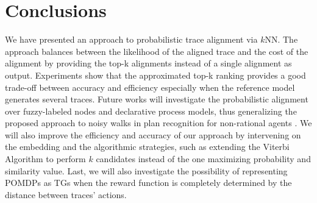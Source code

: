 
\section{Conclusions}
\label{sec:conclusion}

We have presented an approach to probabilistic trace alignment via $k$NN.
The approach balances between the likelihood of the aligned trace and the cost of the alignment by providing the top-k 
alignments instead of a single alignment as output. Experiments show that the approximated top-k ranking provides a good 
trade-off between accuracy and efficiency especially when the reference model generates several traces.
Future works will investigate the probabilistic alignment over fuzzy-labeled nodes and declarative process models, thus 
generalizing the proposed approach to noisy walks in plan recognition for non-rational agents \cite{RamirezG10}. We will also improve 
the efficiency and accuracy of our approach by intervening on the embedding and the algorithmic strategies, such as extending 
the Viterbi Algorithm  to perform $k$ candidates instead of the one maximizing probability and similarity value. Last, we will also 
investigate the possibility of representing POMDPs as TGs when the reward function is completely determined by the distance 
between traces' actions.

